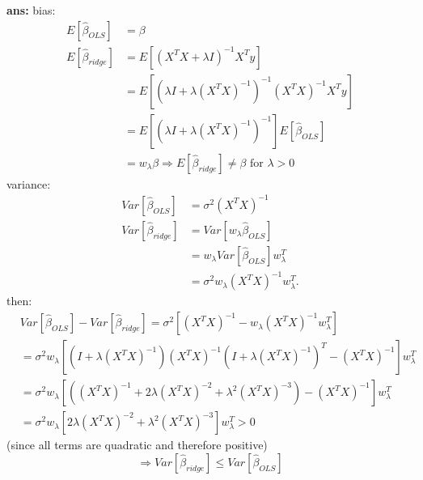 \documentclass[a4paper, norsk, 8pt]{article}
\begin{document}
\begin{multicols*}{2}
\textbf{ans:} bias:
\begin{align}
	E[\hat{\beta}_{OLS}] &= \beta\\
	E[\hat{\beta}_{ridge}] &= E[(X^TX + \lambda I)^{-1}X^Ty]\\
	 &= E[(\lambda I + \lambda(X^TX)^{-1})^{-1}(X^TX)^{-1}X^Ty]\\
	 &= E[(\lambda I + \lambda(X^TX)^{-1})^{-1}] E[\hat{\beta}_{OLS}]\\
	 &= w_\lambda \beta \Rightarrow E[\hat{\beta}_{ridge}]\neq \beta \text{ for } \lambda>0
\end{align}
variance:
\begin{align}
	Var[\hat{\beta}_{OLS}] &= \sigma^2 (X^TX)^{-1}\\
	Var[\hat{\beta}_{ridge}] &= Var[w_\lambda \hat{\beta}_{OLS}]\\
	&= w_\lambda Var[\hat{\beta}_{OLS}]w^T_\lambda\\
	&= \sigma^2 w_\lambda (X^TX)^{-1}w^T_\lambda.
\end{align}
then:
\begin{align}
	&Var[\hat{\beta}_{OLS}] - Var[\hat{\beta}_{ridge}] = \sigma^2[(X^TX)^{-1}-w_\lambda (X^TX)^{-1}w^T_\lambda]\\
	&=\sigma^2w_\lambda [(I+\lambda(X^TX)^{-1})(X^TX)^{-1}(I+\lambda(X^TX)^{-1})^T - (X^TX)^{-1}]w^T_\lambda\\
	&= \sigma^2w_\lambda [((X^TX)^{-1}+2\lambda(X^TX)^{-2}+\lambda^2(X^TX)^{-3})-(X^TX)^{-1}] w^T_\lambda\\
	&= \sigma^2w_\lambda [2\lambda(X^TX)^{-2}+\lambda^2(X^TX)^{-3}]w^T_\lambda > 0
\end{align}
(since all terms are quadratic and therefore positive)
\begin{equation}
	\Rightarrow Var[\hat{\beta}_{ridge}] \leq Var[\hat{\beta}_{OLS}]
\end{equation}

\end{multicols*}
\end{document}
